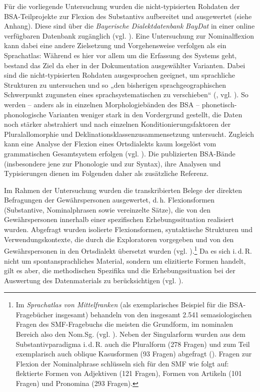Für die vorliegende Untersuchung wurden die nicht-typisierten Rohdaten der BSA-Teilprojekte zur Flexion des Substantivs aufbereitet und ausgewertet (siehe Anhang). Diese sind über die \textit{Bayerische Dialektdatenbank} \textit{BayDat} in einer online verfügbaren Datenbank zugänglich (vgl. ). Eine Untersuchung zur Nominalflexion kann dabei eine andere Zielsetzung und Vorgehensweise verfolgen als ein Sprachatlas: Während es hier vor allem um die Erfassung des Systems geht, bestand das Ziel da eher in der Dokumentation ausgewählter Varianten. Dabei sind die nicht-typisierten Rohdaten ausgesprochen geeignet, um sprachliche Strukturen zu untersuchen und so „den bisherigen sprachgeographischen Schwerpunkt zugunsten eines sprachsystematischen zu verschieben“ (\citealt[22]{Munske2015}, vgl. \citealt[70]{Kretzschmar2018}). So werden -- anders als in einzelnen Morphologiebänden des BSA -- phonetisch-phonologische Varianten weniger stark in den Vordergrund gestellt, die Daten noch stärker abstrahiert und nach einzelnen Konditionierungsfaktoren der Pluralallomorphie und Deklinationsklassenzusammensetzung untersucht. Zugleich kann eine Analyse der Flexion eines Ortsdialekts kaum losgelöst vom grammatischen Gesamtsystem erfolgen (vgl. \citealt[36]{Schmuck2014}). Die publizierten BSA-Bände (insbesondere jene zur Phonologie und zur Syntax), ihre Analysen und Typisierungen dienen im Folgenden daher als zusätzliche Referenz.

Im Rahmen der Untersuchung wurden die transkribierten Belege der direkten Befragungen der Gewährspersonen ausgewertet, d.\,h. Flexionsformen (Substantive, Nominalphrasen sowie vereinzelte Sätze), die von den Gewährspersonen innerhalb einer spezifischen Erhebungssituation realisiert wurden. Abgefragt wurden isolierte Flexionsformen, syntaktische Strukturen und Verwendungskontexte, die durch die Exploratoren vorgegeben und von den Gewährspersonen in den Ortsdialekt übersetzt wurden (vgl. \citealt[23]{Klepsch2013}).\footnote{Im \textit{Sprachatlas von Mittelfranken} (als exemplarisches Beispiel für die BSA-Fragebücher insgesamt) behandeln von den insgesamt 2.541 semasiologischen Fragen des SMF-Fragebuchs die meisten die Grundform, im nominalen Bereich also den Nom.Sg. (vgl. \citealt[24]{Klepsch2013}). Neben der Singularform wurden aus dem Substantivparadigma i.\,d.\,R. auch die Pluralform (278 Fragen) und zum Teil exemplarisch auch oblique Kasusformen (93 Fragen) abgefragt (\citealt[32]{SMF1}). Fragen zur Flexion der Nominalphrase schlüsseln sich für den SMF wie folgt auf: flektierte Formen von Adjektiven (121 Fragen), Formen von Artikeln (101 Fragen) und Pronomina (293 Fragen).} Da es sich i.\,d.\,R. nicht um spontansprachliches Material, sondern um elizitierte Formen handelt, gilt es aber, die methodischen Spezifika und die Erhebungssituation bei der Auswertung des Datenmaterials zu berücksichtigen (vgl. \citealt{NickelKürschner2019}).

